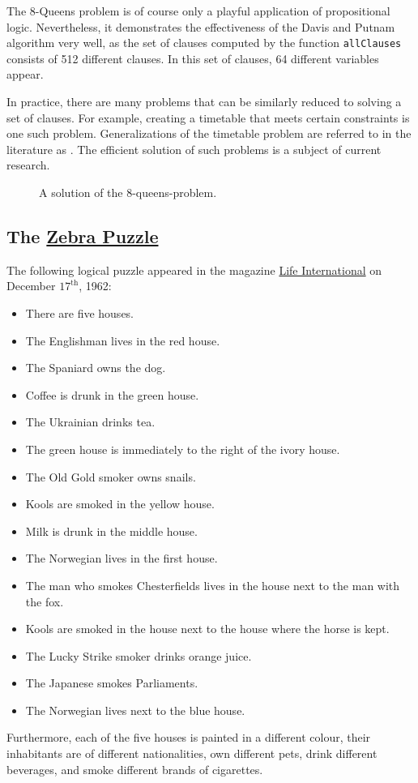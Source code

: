 The 8-Queens problem is of course only a playful application of propositional logic.
Nevertheless, it demonstrates the effectiveness of the Davis and Putnam algorithm very well, as the set of clauses computed by the function \texttt{allClauses}
consists of 512 different clauses. In this set of clauses, 64 different
variables appear.

In practice, there are many problems that can be similarly reduced to solving a
set of clauses. For example, creating a timetable that meets certain constraints is one such problem. Generalizations of the
timetable problem are referred to in the literature as .
The efficient solution of such problems is a subject of current research.

\begin{figure}[!ht]
  \centering
  \caption{A solution of the 8-queens-problem.}
  \label{fig:8-queens.pdf}
\end{figure}
\FloatBarrier
\pagebreak

\subsection{The \href{https://en.wikipedia.org/wiki/Zebra_Puzzle}{Zebra Puzzle} \label{section:zebra}} 
The following logical puzzle appeared in the magazine
\href{https://en.wikipedia.org/wiki/Life_(magazine)}{Life International} 
on December $17^\textrm{th}$, 1962:
\begin{itemize}
\item There are five houses.
\item The Englishman lives in the red house.
\item The Spaniard owns the dog.
\item Coffee is drunk in the green house.
\item The Ukrainian drinks tea.
\item The green house is immediately to the right of the ivory house.
\item The Old Gold smoker owns snails.
\item Kools are smoked in the yellow house.
\item Milk is drunk in the middle house.
\item The Norwegian lives in the first house.
\item The man who smokes Chesterfields lives in the house next to the man with the fox.
\item Kools are smoked in the house next to the house where the horse is kept.
\item The Lucky Strike smoker drinks orange juice.
\item The Japanese smokes Parliaments.
\item The Norwegian lives next to the blue house.
\end{itemize}
Furthermore, each of the five houses is painted in a different colour, their
inhabitants are of different nationalities, own different pets, drink different
beverages, and smoke different brands of cigarettes.  

